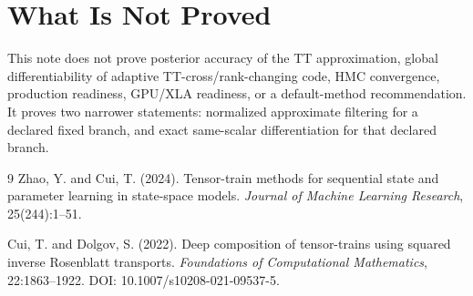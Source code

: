 \documentclass[11pt]{article}
\theoremstyle{definition}
\theoremstyle{remark}
\begin{document}
\section{What Is Not Proved}

This note does not prove posterior accuracy of the TT approximation, global
differentiability of adaptive TT-cross/rank-changing code, HMC convergence,
production readiness, GPU/XLA readiness, or a default-method recommendation.
It proves two narrower statements: normalized approximate filtering for a
declared fixed branch, and exact same-scalar differentiation for that declared
branch.

\begin{thebibliography}{9}
Zhao, Y. and Cui, T. (2024).
\newblock Tensor-train methods for sequential state and parameter learning in
state-space models.
\newblock \emph{Journal of Machine Learning Research}, 25(244):1--51.

Cui, T. and Dolgov, S. (2022).
\newblock Deep composition of tensor-trains using squared inverse Rosenblatt
transports.
\newblock \emph{Foundations of Computational Mathematics}, 22:1863--1922.
\newblock DOI: 10.1007/s10208-021-09537-5.
\end{thebibliography}
\end{document}
